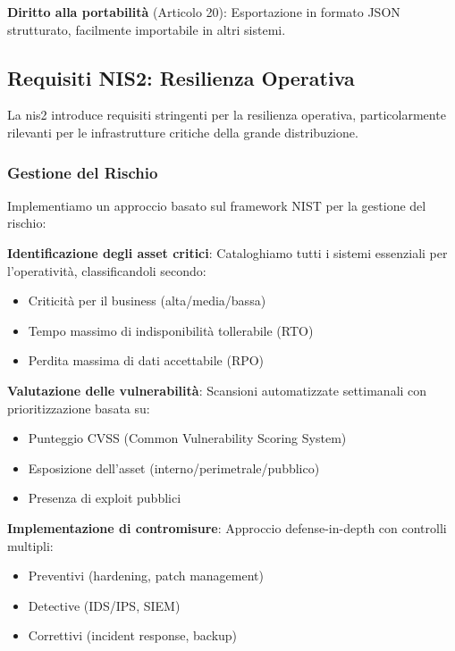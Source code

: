 \textbf{Diritto alla portabilità} (Articolo 20): Esportazione in formato JSON strutturato, facilmente importabile in altri sistemi.

\subsection{Requisiti NIS2: Resilienza Operativa}
\label{subsec:4.4.3_nis2}

La \gls{nis2} introduce requisiti stringenti per la resilienza operativa, particolarmente rilevanti per le infrastrutture critiche della grande distribuzione.

\subsubsection{Gestione del Rischio}

Implementiamo un approccio basato sul framework NIST per la gestione del rischio:

\textbf{Identificazione degli asset critici}: Cataloghiamo tutti i sistemi essenziali per l'operatività, classificandoli secondo:
\begin{itemize}
    \item Criticità per il business (alta/media/bassa)
    \item Tempo massimo di indisponibilità tollerabile (RTO)
    \item Perdita massima di dati accettabile (RPO)
\end{itemize}

\textbf{Valutazione delle vulnerabilità}: Scansioni automatizzate settimanali con prioritizzazione basata su:
\begin{itemize}
    \item Punteggio CVSS (Common Vulnerability Scoring System)
    \item Esposizione dell'asset (interno/perimetrale/pubblico)
    \item Presenza di exploit pubblici
\end{itemize}

\textbf{Implementazione di contromisure}: Approccio defense-in-depth con controlli multipli:
\begin{itemize}
    \item Preventivi (hardening, patch management)
    \item Detective (IDS/IPS, SIEM)
    \item Correttivi (incident response, backup)
\end{itemize}

